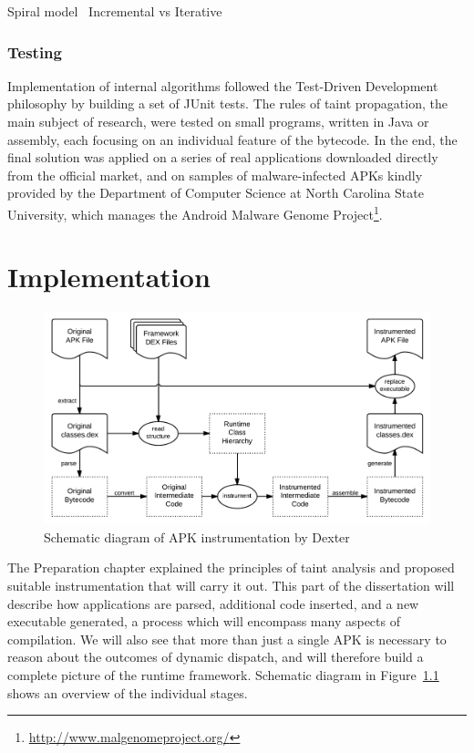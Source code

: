 \documentclass[12pt,twoside,notitlepage]{report}
\newcommand{\weblink}[1] {\footnote{\scriptsize\url{#1}}}
\begin{document}
Spiral model~\cite{Boehm:1988:SMS:45797.45801}
Incremental vs Iterative~\cite{web:IncrementalVsIterative}

\subsection{Testing}

Implementation of internal algorithms followed the Test-Driven Development philosophy by building a set of JUnit tests. The rules of taint propagation, the main subject of research, were tested on small programs, written in Java or assembly, each focusing on an individual feature of the bytecode. In the end, the final solution was applied on a series of real applications downloaded directly from the official market, and on samples of malware-infected APKs kindly provided by the Department of Computer Science at North Carolina State University, which manages the Android Malware Genome Project\weblink{http://www.malgenomeproject.org/}.

\cleardoublepage
\chapter{Implementation}

\begin{figure}
	\centerline{	
		\includegraphics[width=\textwidth]{figs/fig_implementation_overview.png}
	}
	\caption{Schematic diagram of APK instrumentation by Dexter}
	\label{fig:Implementation_Overview}
\end{figure}

The Preparation chapter explained the principles of taint analysis and proposed suitable instrumentation that will carry it out. This part of the dissertation will describe how applications are parsed, additional code inserted, and a new executable generated, a process which will encompass many aspects of compilation. We will also see that more than just a single APK is necessary to reason about the outcomes of dynamic dispatch, and will therefore build a complete picture of the runtime framework. Schematic diagram in Figure~\ref{fig:Implementation_Overview} shows an overview of the individual stages.
\end{document}
